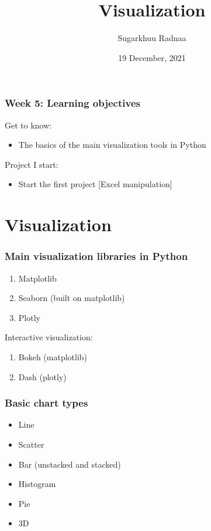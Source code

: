 \documentclass{beamer}
\title[Introduction to Python]{Visualization}
\author{Sugarkhuu Radnaa}
\institute[]
{
Py4Econ in Ulaanbaatar \\ 
\medskip
\textit{py4econ@gmail.com} 
}
\date{19 December, 2021}  %
\begin{document}
\begin{frame}
\titlepage %
\end{frame}

\begin{frame}
    \frametitle{Week 5: Learning objectives}
    Get to know: 
    \begin{itemize}
        \item The basics of the main visualization tools in Python
    \end{itemize}
\vskip 1cm        
    Project I start:
    \begin{itemize} 
        \item Start the first project [Excel manipulation]
    \end{itemize}
\end{frame}

\section{Visualization} 

\begin{frame}
\frametitle{Main visualization libraries in Python}
    \begin{enumerate}
        \item Matplotlib
        \item Seaborn (built on matplotlib)
        \item Plotly       
    \end{enumerate}

\vskip 5mm
Interactive visualization:     
    \begin{enumerate}
        \item Bokeh (matplotlib) 
        \item Dash (plotly)
    \end{enumerate}

\end{frame}

\begin{frame}
    \frametitle{Basic chart types}
        \begin{itemize}
        \item Line
        \item Scatter
        \item Bar (unstacked and stacked)
        \item Histogram
        \item Pie
        \item 3D
        \end{itemize}
\end{frame}
\end{document}
